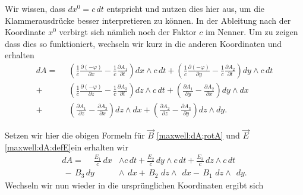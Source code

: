 Wir wissen, dass $dx^0 = c\,dt$ entspricht und nutzen dies hier aus, um die Klammerausdrücke besser interpretieren zu können.
In der Ableitung nach der Koordinate $x^0$ verbirgt sich nämlich noch der Faktor $c$ im Nenner.
Um zu zeigen dass dies so funktioniert, wechseln wir kurz in die anderen Koordinaten und erhalten
\begin{align*}
	dA = \phantom{\frac{1}{c}}
	& \left(\frac{1}{c}\frac{\partial (-\varphi)}{\partial x}-\frac{1}{c}\frac{\partial A_1}{\partial t}\right) dx \wedge c\,dt 
	+ \left(\frac{1}{c}\frac{\partial (-\varphi)}{\partial y}-\frac{1}{c}\frac{\partial A_2}{\partial t}\right) dy \wedge c\,dt 
	\\
	+ &\left(\frac{1}{c}\frac{\partial (-\varphi)}{\partial z}-\frac{1}{c}\frac{\partial A_3}{\partial t}\right) dz \wedge c\,dt
	+ \left(\frac{\partial A_1}{\partial y}-\frac{\partial A_2}{\partial x}\right) dy \wedge dx 
	\\
	+ &\left(\frac{\partial A_1}{\partial z}-\frac{\partial A_3}{\partial x}\right) dz \wedge dx 
	+ \left(\frac{\partial A_2}{\partial z}-\frac{\partial A_3}{\partial y}\right) dz \wedge dy.
\end{align*}
\begin{comment}
Diesen Teil oben rausgenommen da hier die c verschwinden (vermutlich irrelevant:)
& = \left(\frac{\partial (-\phi)}{\partial x}-\frac{\partial A_1}{\partial t}\right) dx \wedge dt +
\left(\frac{\partial (-\phi)}{\partial y}-\frac{\partial A_2}{\partial t}\right) dy \wedge dt +
\left(\frac{\partial (-\phi)}{\partial z}-\frac{\partial A_3}{\partial t}\right) dz \wedge dt\\
& + \left(\frac{\partial A_1}{\partial y}-\frac{\partial A_2}{\partial x}\right) dy \wedge dx +
\left(\frac{\partial A_1}{\partial z}-\frac{\partial A_3}{\partial x}\right) dz \wedge dx +
\left(\frac{\partial A_2}{\partial z}-\frac{\partial A_3}{\partial y}\right) dz \wedge dy.\\
\end{comment}
Setzen wir hier die obigen Formeln für $\vec{B}$ \eqref{maxwell:dA;rotA} und $\vec{E}$ \eqref{maxwell:dA:defE}ein erhalten wir
\begin{align*}
	dA = \phantom{+}
	\frac{E_1}{c} \,dx &\wedge c\,dt +
	\frac{E_2}{c} \,dy \wedge c\,dt +
	\frac{E_3}{c} \,dz \wedge c\,dt
	\\
	\, - \, B_3 \, dy &\wedge \phantom{c}dx +
	\, B_2 \,  \, dz \wedge \phantom{c} dx -
	\, B_1 \, \, dz \wedge \phantom{c} dy.
\end{align*}
Wechseln wir nun wieder in die ursprünglichen Koordinaten ergibt sich
